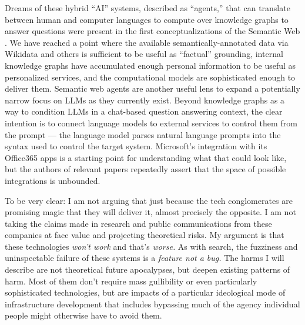 Dreams of these hybrid ``AI'' systems, described as ``agents,'' that can
translate between human and computer languages to compute over knowledge
graphs to answer questions were present in the first conceptualizations
of the Semantic Web \cite{berners-leeSemanticWeb2001} . We have reached a point where the
available semantically-annotated data via Wikidata and others is
sufficient to be useful as ``factual'' grounding, internal knowledge
graphs have accumulated enough personal information to be useful as
personalized services, and the computational models are sophisticated
enough to deliver them. Semantic web agents are another useful lens to
expand a potentially narrow focus on LLMs as they currently exist.
Beyond knowledge graphs as a way to condition LLMs in a chat-based
question answering context, the clear intention is to connect language
models to external services to control them from the prompt \cite{bubeckSparksArtificialGeneral2023}  --- the language model parses
natural language prompts into the syntax used to control the target
system. Microsoft's integration with its Office365 apps is a starting
point for understanding what that could look like, but the authors of
relevant papers repeatedly assert that the space of possible
integrations is unbounded.

To be very clear: I am not arguing that just because the tech
conglomerates are promising magic that they will deliver it, almost
precisely the opposite. I am not taking the claims made in research and
public communications from these companies at face value and projecting
theoretical risks. My argument is that these
technologies \emph{won't work} and that's \emph{worse.} As with search,
the fuzziness and uninspectable failure of these systems is a
\emph{feature not a bug.} The harms I will describe are not theoretical
future apocalypses, but deepen existing patterns of harm. Most of them
don't require mass gullibility or even particularly sophisticated
technologies, but are impacts of a particular ideological mode of
infrastructure development that includes bypassing much of the agency
individual people might otherwise have to avoid them.

